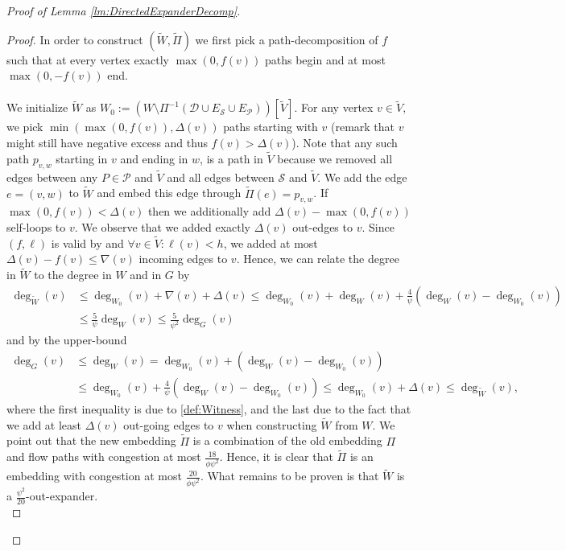 \documentclass[11pt]{article}
\newcommand\bell{\boldsymbol{\mathit{\ell}}}
\newcommand\ff{\boldsymbol{\mathit{f}}}
\begin{document}
\begin{proof}[Proof of Lemma \ref{lm:DirectedExpanderDecomp}]
\begin{proof}
In order to construct $(\tilde{W}, \tilde{\Pi})$ we first pick a path-decomposition of $\ff$ such that at every vertex exactly $\max(0, \ff(v))$ paths begin and at most $\max(0, -\ff(v))$ end. \\
\\
We initialize $\tilde{W}$ as $W_0 := \left(W \setminus \Pi^{-1}(\mathcal{D} \cup E_{\mathcal{S}} \cup E_{\mathcal{P}})\right)[\tilde{V}]$. For any vertex $v \in \tilde{V},$ we pick $\min(\max(0, \ff(v)) , \Delta(v))$ paths starting with $v$ (remark that $v$ might still have negative excess and thus $\ff(v) > \Delta(v)$). Note that any such path $p_{v,w}$ starting in $v$ and ending in $w$, is a path in $\tilde{V}$ because we removed all edges between any $P \in \mathcal{P}$ and $\tilde{V}$ and all edges between $\mathcal{S}$ and $\tilde{V}$. We add the edge $e = (v,w)$ to $\tilde{W}$ and embed this edge through $\tilde{\Pi}(e) = p_{v,w}$. If $\max(0, \ff(v)) < \Delta(v)$ then we additionally add $\Delta(v) - \max(0, \ff(v))$ self-loops to $v$. We observe that we added exactly $\Delta(v)$ out-edges to $v$. Since $(\ff, \bell)$ is valid by  and $\forall v \in \tilde{V}: \bell(v) < h$, we added at most $\Delta(v) - \ff(v) \leq \nabla(v)$ incoming edges to $v$. Hence, we can relate the degree in $\tilde{W}$ to the degree in $W$ and in $G$ by
\begin{align}\label{proof:PruneOrCertify1}
    \deg_{\tilde{W}}(v) &\leq \deg_{W_0}(v) + \nabla(v) + \Delta(v) \nonumber \leq \deg_{W_0}(v) + \deg_W(v) + \frac{4}{\psi}\left(\deg_W(v) - \deg_{W_0}(v)\right) \nonumber \\
    &\leq \frac{5}{\psi} \deg_W(v) \leq \frac{5}{\psi^2} \deg_G(v)
\end{align}
and by the upper-bound 
\begin{align*}
    \deg_G(v) &\leq \deg_W(v) = \deg_{W_0}(v) + \left(\deg_W(v) - \deg_{W_0}(v)\right) \\
    &\leq \deg_{W_0}(v) + \frac{4}{\psi}\left(\deg_W(v) - \deg_{W_0}(v)\right) \leq \deg_{W_0}(v) + \Delta(v) \leq \deg_{\tilde{W}}(v),
\end{align*}
where the first inequality is due to \eqref{def:Witness}, and the last due to the fact that we add at least $\Delta(v)$ out-going edges to $v$ when constructing $\tilde{W}$ from $W$. We point out that the new embedding $\tilde{\Pi}$ is a combination of the old embedding $\Pi$ and flow paths with congestion at most $\frac{18}{\phi \psi^2}$. Hence, it is clear that $\tilde{\Pi}$ is an embedding with congestion at most $\frac{20}{\phi\psi^2}$. What remains to be proven is that $\tilde{W}$ is a $\frac{\psi^2}{20}$-out-expander.\\

\end{proof}
\end{proof}
\end{document}

